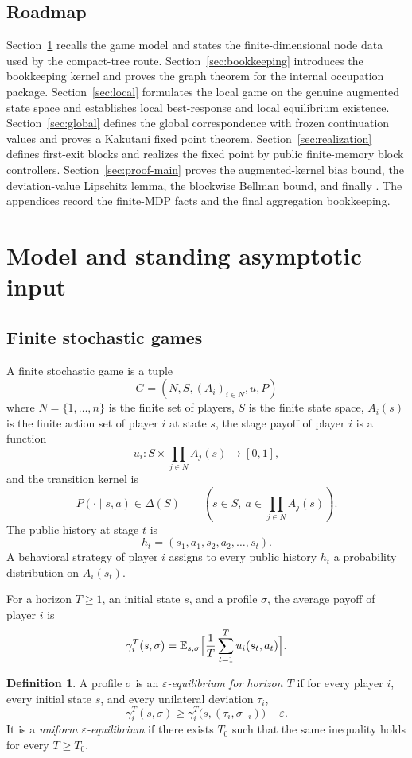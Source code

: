 \documentclass[12pt]{article}
\theoremstyle{definition}
\newtheorem{definition}[theorem]{Definition}
\newcommand{\eps}{\varepsilon}
\newcommand{\E}{\mathbb{E}}
\newcommand{\1}{\mathbf{1}}
\begin{document}
\subsection{Roadmap}


Section~\ref{sec:model} recalls the game model and states the finite-dimensional
node data used by the compact-tree route. Section~\ref{sec:bookkeeping}
introduces the bookkeeping kernel and proves the graph theorem for the internal
occupation package. Section~\ref{sec:local} formulates the local game on the
genuine augmented state space and establishes local best-response and local
equilibrium existence. Section~\ref{sec:global} defines the global correspondence
with frozen continuation values and proves a Kakutani fixed point theorem.
Section~\ref{sec:realization} defines first-exit blocks and realizes the fixed
point by public finite-memory block controllers. Section~\ref{sec:proof-main}
proves the augmented-kernel bias bound, the deviation-value Lipschitz lemma, the
blockwise Bellman bound, and finally . The appendices record the
finite-MDP facts and the final aggregation bookkeeping.

\section{Model and standing asymptotic input}
\label{sec:model}

\subsection{Finite stochastic games}

A finite stochastic game is a tuple
\[
G=(N,S,(A_i)_{i\in N},u,P)
\]
where $N=\{1,\dots,n\}$ is the finite set of players, $S$ is the finite state
space, $A_i(s)$ is the finite action set of player $i$ at state $s$, the stage
payoff of player $i$ is a function
\[
u_i:S\times \prod_{j\in N}A_j(s)\to [0,1],
\]
and the transition kernel is
\[
P(\cdot\mid s,a)\in \Delta(S)
\qquad (s\in S,\ a\in \prod_{j\in N}A_j(s)).
\]
The public history at stage $t$ is
\[
h_t=(s_1,a_1,s_2,a_2,\dots,s_t).
\]
A behavioral strategy of player $i$ assigns to every public history $h_t$ a
probability distribution on $A_i(s_t)$.

For a horizon $T\ge 1$, an initial state $s$, and a profile $\sigma$, the average
payoff of player $i$ is
\[
\gamma_i^T(s,\sigma)
=
\E_{s,\sigma}\Bigl[\frac1T\sum_{t=1}^T u_i(s_t,a_t)\Bigr].
\]

\begin{definition}
A profile $\sigma$ is an \emph{$\eps$-equilibrium for horizon $T$} if for every
player $i$, every initial state $s$, and every unilateral deviation $\tau_i$,
\[
\gamma_i^T(s,\sigma)
\ge
\gamma_i^T\bigl(s,(\tau_i,\sigma_{-i})\bigr)-\eps.
\]
It is a \emph{uniform $\eps$-equilibrium} if there exists $T_0$ such that the same
inequality holds for every $T\ge T_0$.
\end{definition}
\end{document}
